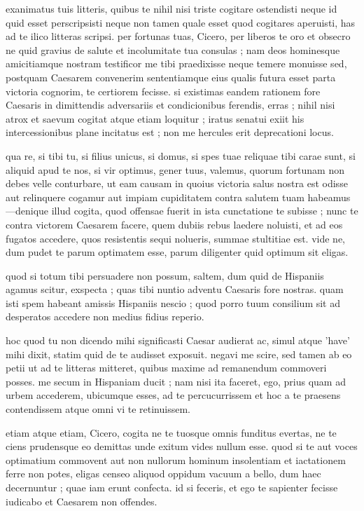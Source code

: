 


 exanimatus tuis litteris, quibus te nihil nisi triste cogitare ostendisti neque id quid esset perscripsisti neque non tamen quale esset quod cogitares aperuisti, has ad te ilico litteras scripsi. per fortunas tuas, Cicero, per liberos te oro et obsecro ne quid gravius de salute et incolumitate tua consulas ; nam deos hominesque amicitiamque nostram testificor me tibi praedixisse neque temere monuisse sed, postquam Caesarem convenerim sententiamque eius qualis futura esset parta victoria cognorim, te certiorem fecisse. si existimas eandem rationem fore Caesaris in dimittendis adversariis et condicionibus ferendis, erras ; nihil nisi atrox et saevum cogitat atque etiam loquitur ; iratus senatui exiit his intercessionibus plane incitatus est ; non me hercules erit deprecationi locus.

 qua re, si tibi tu, si filius unicus, si domus, si spes tuae reliquae tibi carae sunt, si aliquid apud te nos, si vir optimus, gener tuus, valemus, quorum fortunam non debes velle conturbare, ut eam causam in quoius victoria salus nostra est odisse aut relinquere cogamur aut impiam cupiditatem contra salutem tuam habeamus—denique illud cogita, quod offensae fuerit in ista cunctatione te subisse ; nunc te contra victorem Caesarem facere, quem dubiis rebus laedere noluisti, et ad eos fugatos accedere, quos resistentis sequi nolueris, summae stultitiae est. vide ne, dum pudet te parum optimatem esse, parum diligenter quid optimum sit eligas.

 quod si totum tibi persuadere non possum, saltem, dum quid de Hispaniis agamus scitur, exspecta ; quas tibi nuntio adventu Caesaris fore nostras. quam isti spem habeant amissis Hispaniis nescio ; quod porro tuum consilium sit ad desperatos accedere non medius fidius reperio.

 hoc quod tu non dicendo mihi significasti Caesar audierat ac, simul atque 'have' mihi dixit, statim quid de te audisset exposuit. negavi me scire, sed tamen ab eo petii ut ad te litteras mitteret, quibus maxime ad remanendum commoveri posses. me secum in Hispaniam ducit ; nam nisi ita faceret, ego, prius quam ad urbem accederem, ubicumque esses, ad te percucurrissem et hoc a te praesens contendissem atque omni vi te retinuissem.

 etiam atque etiam, Cicero, cogita ne te tuosque omnis funditus evertas, ne te ciens prudensque eo demittas unde exitum vides nullum esse. quod si te aut voces optimatium commovent aut non nullorum hominum insolentiam et iactationem ferre non potes, eligas censeo aliquod oppidum vacuum a bello, dum haec decernuntur ; quae iam erunt confecta. id si feceris, et ego te sapienter fecisse iudicabo et Caesarem non offendes.
